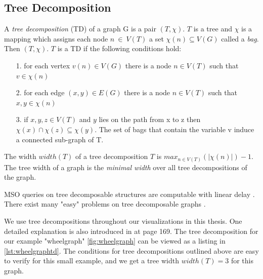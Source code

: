 \documentclass[a4paper, 12pt, bibliography=totoc]{scrartcl}
\begin{document}

\subsection{Tree Decomposition}
A \textit{tree decomposition} (TD) of a graph G is a pair $(T, \chi)$. $T$ is a tree and $\chi$ is a mapping which assigns each node $n~\in~V(T)$ 
a set $\chi(n) \subseteq V(G)$ called a \textit{bag}. Then $(T, \chi)$. $T$ is a TD if the following conditions hold:

\begin{itemize}
	\item[1.] for each vertex $v(n) \in V(G)$ there is a node $n \in V(T)$ such that $v \in \chi(n)$
	\item[2.] for each edge $(x,y) \in E(G)$ there is a node $n\in V(T)$ such that $x,y \in\chi(n)$
	\item[3.] if $x,y,z \in V(T)$ and $y$ lies on the path from x to z then $\chi(x) \cap \chi(z) \subseteq \chi(y)$. The set of bags that contain the variable v induce a connected sub-graph of T.
\end{itemize}
The width $width(T)$ of a tree decomposition $T$ is $max_{n\in V(T)}(|\chi(n)|)-1$.
The tree width of a graph is the \textit{minimal width} over all tree decompositions of the graph. 


MSO queries on tree decomposable structures are computable with linear delay \cite{MSOQueriesGuillaume}. There exist many "easy" problems on tree decomposable graphs \cite{ARNBORG1991308}.

We use tree decompositions throughout our visualizations in this thesis. One detailed explanation is also introduced in \cite{pcgp2019} at page 169.
The tree decomposition for our example "wheelgraph" \ref{fig:wheelgraph} can be viewed as a listing in \ref{lst:wheelgraphtd}. The conditions for tree decompositions outlined above are easy to verify for this small example, and we get a tree width $width(T)=3$ for this graph.
\end{document}
